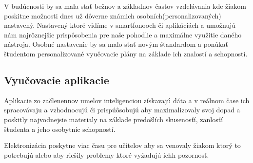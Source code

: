 \documentclass[10pt,oneside,slovak,a4paper]{article}
\begin{document}
V budúcnosti by sa mala stať bežnov a základnov častov vzdelávania kde žiakom poskitne možnosti dnes už dôverne známich osobních(personalizovaných) nastavený. Nastavený ktoré vidíme v smartfonooch či aplikáciách a umožnujú nám najrôznejšie prispôsobenia pre naše pohodlie a maximálne využitie daného nástroja. Osobné nastavenie by sa malo stať novým štandardom a ponúkať študentom personalizované vyučovacie plány na základe ich znalostí a schopností.

\subsection{Vyučovacie aplikacie}

Aplikacie zo začlenennov umelov inteligenciou získavajú dáta a v reálnom čase ich spracovávaju a vzhodnocujú či prispúôsobujú aby maximalizovaly svoj dopad a poskitly najvodnejsie materialy na základe predošlích skusenosťí, zanlosťí študenta a jeho osobytníc schopností.

Elektronizácia poskytne viac času pre učitelov aby sa venovaly žiakom ktorý to potrebujú alebo aby riešily problemy ktoré vyžadujú ichh pozornosť.  
\end{document}
